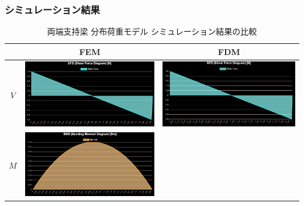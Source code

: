 \documentclass{jsarticle}
\begin{document}
\subsubsection{シミュレーション結果}
\begin{table}[H]
\begin{center}
\caption{両端支持梁 分布荷重モデル シミュレーション結果の比較}
\begin{tabular}{|c|c|c|}
\hline
 & FEM & FDM \\
\hline
\hline
$V$ &
\begin{minipage}{6truecm}
\centering
\includegraphics[width=6truecm]{simple_distributed_model_FEM_sf.PNG}
\end{minipage}
&
\begin{minipage}{6truecm}
\centering
\includegraphics[width=6truecm]{simple_distributed_model_FDM_sf.PNG}
\end{minipage}
\\
\hline
$M$ &
\begin{minipage}{6truecm}
\centering
\includegraphics[width=6cm]{simple_distributed_model_FEM_bm.PNG}

\end{minipage}
\end{tabular}
\end{center}
\end{table}
\end{document}

